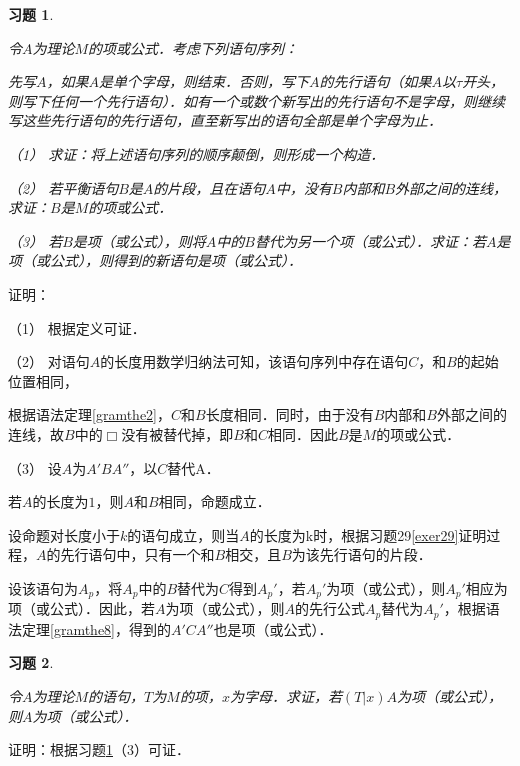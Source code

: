 \documentclass[12pt, a4paper, oneside]{book}
\newtheorem{exer}{习题}
\begin{document}
			\begin{exer}\label{exer31}
				\hfill\par
				令$A$为理论$M$的项或公式．考虑下列语句序列：
				\par
				先写$A$，如果$A$是单个字母，则结束．否则，写下$A$的先行语句（如果$A$以$\tau$开头，则写下任何一个先行语句）．如有一个或数个新写出的先行语句不是字母，则继续写这些先行语句的先行语句，直至新写出的语句全部是单个字母为止．
				\par
				（1）	求证：将上述语句序列的顺序颠倒，则形成一个构造．
				\par
				（2）	若平衡语句$B$是$A$的片段，且在语句$A$中，没有$B$内部和$B$外部之间的连线，求证：$B$是$M$的项或公式．
				\par
				（3）	若$B$是项（或公式），则将$A$中的$B$替代为另一个项（或公式）．求证：若$A$是项（或公式），则得到的新语句是项（或公式）．
			\end{exer}
			证明：
			\par
			（1）	根据定义可证．
			\par
			（2）	
			对语句$A$的长度用数学归纳法可知，该语句序列中存在语句$C$，和$B$的起始位置相同，
			\par
			根据语法定理\ref{gramthe2}，$C$和$B$长度相同．同时，由于没有$B$内部和$B$外部之间的连线，故$B$中的$\Box$没有被替代掉，即$B$和$C$相同．因此$B$是$M$的项或公式．
			\par
			（3）	设$A$为$A'BA''$，以$C$替代A．
			\par
			若$A$的长度为$1$，则$A$和$B$相同，命题成立．
			\par
			设命题对长度小于$k$的语句成立，则当$A$的长度为k时，根据习题29\ref{exer29}证明过程，$A$的先行语句中，只有一个和$B$相交，且$B$为该先行语句的片段．
			\par
			设该语句为$A_p$，将$A_p$中的$B$替代为$C$得到$A_p'$，若$A_p'$为项（或公式），则$A_p'$相应为项（或公式）．因此，若$A$为项（或公式），则$A$的先行公式$A_p$替代为$A_p'$，根据语法定理\ref{gramthe8}，得到的$A'CA''$也是项（或公式）．

			\begin{exer}\label{exer32}
				\hfill\par
				令$A$为理论$M$的语句，$T$为$M$的项，$x$为字母．求证，若$(T|x)A$为项（或公式），则$A$为项（或公式）．
			\end{exer}
			证明：根据习题\ref{exer31}（3）可证．
			
\end{document}
